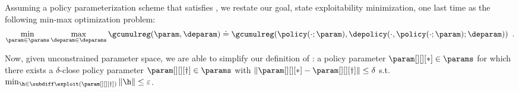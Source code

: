 
Assuming a policy parameterization scheme that satisfies , we restate our goal, state exploitability minimization, one last time as the following min-max optimization problem:
\begin{align}
\label{eq:new_min_max_opt}
    \min_{\param \in \params}
        \max_{\deparam \in \deparams} 
        \gcumulreg (\param, \deparam)
        \doteq \gcumulreg (\policy (\cdot; \param), \depolicy (\cdot, \policy (\cdot; \param); \deparam)) \enspace .
\end{align}



Now, given unconstrained parameter space, we are able to simplify our definition of : a policy parameter $\param[][][*]\in \params$ for which there exists a $\delta$-close policy parameter $\param[][][\dagger]\in \params$ with $\|\param[][][*]-\param[][][\dagger]\|\leq \delta$ s.t. $\min_{\h\in \subdiff \exploit(\param[][][\dagger])} \|\h\| \leq \varepsilon$.

